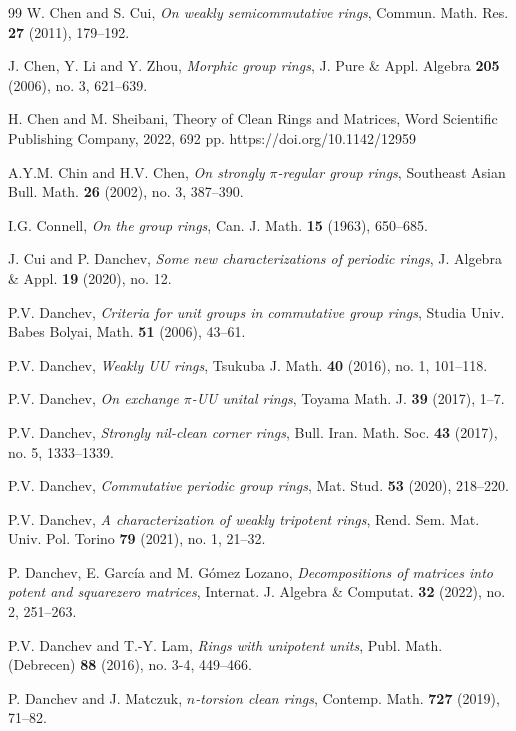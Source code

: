 \documentclass[12pt]{amsart}
\theoremstyle{definition}
\theoremstyle{remark}
\numberwithin{equation}{section}
\begin{document}
\begin{thebibliography}{99}
W. Chen and S. Cui, {\it On weakly semicommutative rings}, Commun. Math. Res. \textbf{27} (2011), 179--192.

J. Chen, Y. Li and Y. Zhou, {\it Morphic group rings}, J. Pure \& Appl. Algebra \textbf{205} (2006), no. 3, 621--639.

H. Chen and M. Sheibani, Theory of Clean Rings and Matrices, Word Scientific Publishing Company, 2022, 692 pp.
https://doi.org/10.1142/12959

A.Y.M. Chin and H.V. Chen, {\it On strongly $\pi$-regular group rings}, Southeast Asian Bull. Math. \textbf{26} (2002), no. 3, 387--390.

I.G. Connell, {\it On the group rings}, Can. J. Math. \textbf{15} (1963), 650--685.

J. Cui and P. Danchev, {\it Some new characterizations of periodic rings}, J. Algebra \& Appl. \textbf{19} (2020), no. 12.

P.V. Danchev, {\it Criteria for unit groups in commutative group rings}, Studia Univ. Babes Bolyai, Math. \textbf{51} (2006), 43--61.

P.V. Danchev, {\it Weakly UU rings}, Tsukuba J. Math. {\bf 40} (2016), no. 1, 101--118.

P.V. Danchev, {\it On exchange $\pi$-UU unital rings}, Toyama Math. J. \textbf{39} (2017), 1--7.

P.V. Danchev, {\it Strongly nil-clean corner rings}, Bull. Iran. Math. Soc. \textbf{43} (2017), no. 5, 1333--1339.

P.V. Danchev, {\it Commutative periodic group rings}, Mat. Stud. \textbf{53} (2020), 218--220.

P.V. Danchev, {\it A characterization of weakly tripotent rings}, Rend. Sem. Mat. Univ. Pol. Torino \textbf{79} (2021), no. 1, 21--32.

P. Danchev, E. Garc\'ia and M. G\'omez Lozano, {\it Decompositions of matrices into potent and squarezero matrices}, Internat. J. Algebra \& Computat. \textbf{32} (2022), no. 2, 251--263.

P.V. Danchev and T.-Y. Lam, {\it Rings with unipotent units}, Publ. Math. (Debrecen) \textbf{88} (2016), no. 3-4, 449--466.

P. Danchev and J. Matczuk, {\it $n$-torsion clean rings}, Contemp. Math. \textbf{727} (2019), 71--82.


\end{thebibliography}
\end{document}
